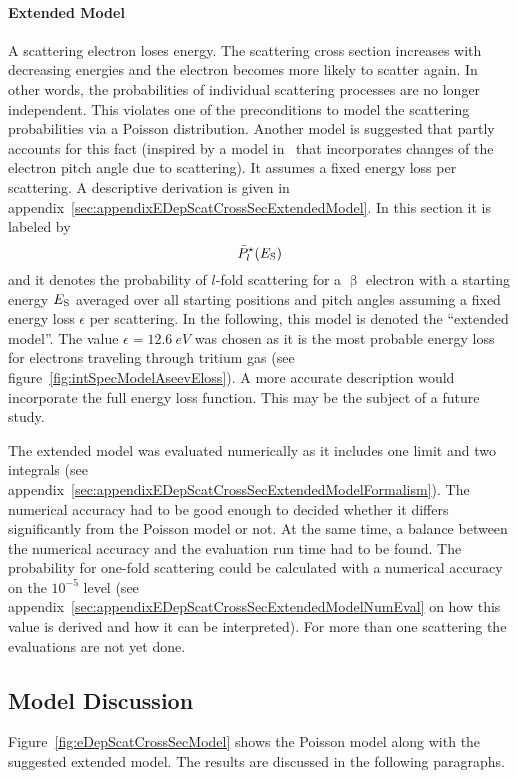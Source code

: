 \paragraph{Extended Model}
A scattering electron loses energy. The scattering cross section increases with decreasing energies and the electron becomes more likely to scatter again. In other words, the probabilities of individual scattering processes are no longer independent. This violates one of the preconditions to model the scattering probabilities via a Poisson distribution. Another model is suggested that partly accounts for this fact (inspired by a model in~\cite{Groh2015} that incorporates changes of the electron pitch angle due to scattering). It assumes a fixed energy loss per scattering. A descriptive derivation is given in appendix~\ref{sec:appendixEDepScatCrossSecExtendedModel}. In this section it is labeled by
\begin{equation}
	\label{eq:eDepScatCrossSecModelExtended}
	\bar{P}^{\star}_l(E_\mathrm{S})
\end{equation}
and it denotes the probability of $l$-fold scattering for a $\upbeta$ electron with a starting energy $E_\mathrm{S}$ averaged over all starting positions and pitch angles assuming a fixed energy loss $\epsilon$ per scattering. In the following, this model is denoted the ``extended model''. The value $\epsilon=\SI{12.6}{eV}$ was chosen as it is the most probable energy loss for electrons traveling through tritium gas (see figure~\ref{fig:intSpecModelAseevEloss}). A more accurate description would incorporate the full energy loss function. This may be the subject of a future study. 

The extended model was evaluated numerically as it includes one limit and two integrals (see appendix~\ref{sec:appendixEDepScatCrossSecExtendedModelFormalism}). The numerical accuracy had to be good enough to decided whether it differs significantly from the Poisson model or not. At the same time, a balance between the numerical accuracy and the evaluation run time had to be found. The probability for one-fold scattering could be calculated with a numerical accuracy on the $10^{-5}$ level (see appendix~\ref{sec:appendixEDepScatCrossSecExtendedModelNumEval} on how this value is derived and how it can be interpreted). For more than one scattering the evaluations are not yet done.

\subsection{Model Discussion}
\label{sec:eDepScatCrossSecModelDiscussion}
Figure~\ref{fig:eDepScatCrossSecModel} shows the Poisson model along with the suggested extended model. The results are discussed in the following paragraphs.

